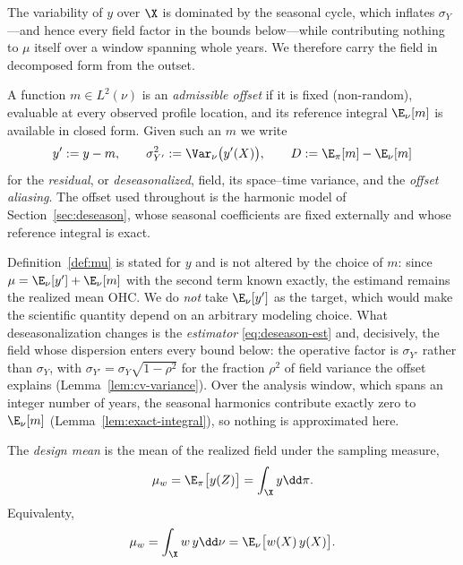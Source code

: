 The variability of $y$ over $\X$ is dominated by the seasonal cycle,
which inflates $\sigma_Y$---and hence every field factor in the bounds
below---while contributing nothing to $\mu$ itself over a window spanning
whole years. We therefore carry the field in decomposed form from the
outset.

\begin{definition}
\label{def:offset}
A function $m\in L^2(\nu)$ is an \emph{admissible offset} if it is fixed
(non-random), evaluable at every observed profile location, and its
reference integral $\E_\nu[m]$ is available in closed form. Given such an
$m$ we write
\[
  y' := y-m,\qquad
  \sigma_{Y'}^2 := \Var_\nu\big(y'(X)\big),\qquad
  D := \E_\pi[m]-\E_\nu[m]
\]
for the \emph{residual}, or \emph{deseasonalized}, field, its space--time
variance, and the \emph{offset aliasing}. The offset used throughout is
the harmonic model of Section~\ref{sec:deseason}, whose seasonal
coefficients are fixed externally and whose reference integral is exact.
\end{definition}

\begin{remark}
\label{rem:estimand-invariance}
Definition~\ref{def:mu} is stated for $y$ and is not altered by the
choice of $m$: since $\mu=\E_\nu[y']+\E_\nu[m]$ with the second term
known exactly, the estimand remains the realized mean OHC. We do
\emph{not} take $\E_\nu[y']$ as the target, which would make the
scientific quantity depend on an arbitrary modeling choice. What
deseasonalization changes is the \emph{estimator}
\eqref{eq:deseason-est} and, decisively, the field whose dispersion
enters every bound below: the operative factor is $\sigma_{Y'}$ rather
than $\sigma_Y$, with $\sigma_{Y'}=\sigma_Y\sqrt{1-\rho^2}$ for the
fraction $\rho^2$ of field variance the offset explains
(Lemma~\ref{lem:cv-variance}). Over the analysis window, which spans an
integer number of years, the seasonal harmonics contribute exactly zero
to $\E_\nu[m]$ (Lemma~\ref{lem:exact-integral}), so nothing is
approximated here.
\end{remark}

\begin{definition}
\label{def:mu-w}
The \emph{design mean} is the mean of the realized field under the sampling measure,
\[
  \mu_w = \E_\pi\big[y(Z)\big] = \int_\X y \dd\pi.
\]
Equivalenty,
\[
  \mu_w = \int_\X w\,y \dd\nu = \E_\nu\big[w(X)\,y(X)\big].
\]

\end{definition}

